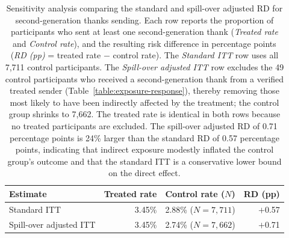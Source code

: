 \documentclass[9pt,twoside,lineno]{pnas-new}
\begin{document}
\clearpage
\begin{table}[ht]
\centering
\small
\caption{Sensitivity analysis comparing the standard and spill-over adjusted RD for second-generation thanks sending. Each row reports the proportion of participants who sent at least one second-generation thank (\textit{Treated rate} and \textit{Control rate}), and the resulting risk difference in percentage points (\textit{RD (pp)} = treated rate $-$ control rate). The \textit{Standard ITT} row uses all 7{,}711 control participants. The \textit{Spill-over adjusted ITT} row excludes the 49 control participants who received a second-generation thank from a verified treated sender (Table~\ref{table:exposure-response}), thereby removing those most likely to have been indirectly affected by the treatment; the control group shrinks to 7{,}662. The treated rate is identical in both rows because no treated participants are excluded. The spill-over adjusted RD of 0.71 percentage points is 24\% larger than the standard RD of 0.57 percentage points, indicating that indirect exposure modestly inflated the control group's outcome and that the standard ITT is a conservative lower bound on the direct effect.}
\label{table:purified-itt}
\begin{tabular}{l r r r}
\toprule
\textbf{Estimate} & \textbf{Treated rate} & \textbf{Control rate ($N$)} & \textbf{RD (pp)} \\
\midrule
Standard ITT & 3.45\% & 2.88\% ($N = 7{,}711$) & $+$0.57 \\
Spill-over adjusted ITT & 3.45\% & 2.74\% ($N = 7{,}662$) & $+$0.71 \\
\bottomrule
\end{tabular}
\end{table}

\FloatBarrier


\end{document}
